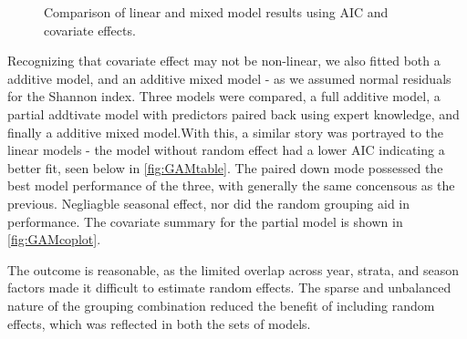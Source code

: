 \documentclass[12pt]{article}
\begin{document}
\begin{figure}[H]
    \caption{Comparison of linear and mixed model results using AIC and covariate effects.}
    \label{fig:lmvslmmfig}
\end{figure}

Recognizing that covariate effect may not be non-linear, we also fitted both a
additive model, and an additive mixed model - as we assumed normal residuals for
the Shannon index. Three models were compared, a full additive model, a partial
addtivate model with predictors paired back using expert knowledge, and finally
a additive mixed model.With this, a similar story was portrayed to the linear models
- the model without random effect had a lower AIC indicating a better fit, seen
below in \ref{fig:GAMtable}. The paired down mode possessed the best model
performance of the three, with generally the same concensous as the previous.
Negliagble seasonal effect, nor did the random grouping aid in performance. The
covariate summary for the partial model is shown in \ref{fig:GAMcoplot}.

The outcome is reasonable, as the limited overlap across year, strata, and season
factors made it difficult to estimate random effects. The sparse and unbalanced
nature of the grouping combination reduced the benefit of including random
effects, which was reflected in both the sets of models. 
\end{document}
